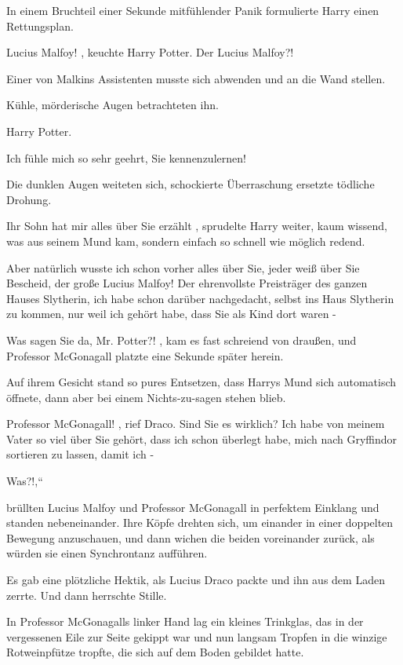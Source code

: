 In einem Bruchteil einer Sekunde mitfühlender Panik formulierte Harry einen Rettungsplan.

\glqq Lucius Malfoy!\grqq{} , keuchte Harry Potter. \glqq Der Lucius Malfoy?!\grqq{}

Einer von
Malkins Assistenten musste sich abwenden und an die Wand stellen.

Kühle, mörderische Augen betrachteten ihn.

\glqq Harry Potter.\grqq{}

\glqq Ich fühle mich so sehr geehrt, Sie kennenzulernen!\grqq{}

Die dunklen Augen weiteten sich, schockierte Überraschung ersetzte tödliche Drohung.

\glqq Ihr
Sohn hat mir alles über Sie erzählt\grqq{} , sprudelte Harry weiter, kaum wissend, was aus seinem Mund kam, sondern
einfach so schnell wie möglich redend.

\glqq Aber natürlich wusste ich schon vorher alles über Sie, jeder
weiß über Sie Bescheid, der große Lucius Malfoy! Der ehrenvollste Preisträger des ganzen Hauses Slytherin, ich habe
schon darüber nachgedacht, selbst ins Haus Slytherin zu kommen, nur weil ich gehört habe, dass Sie als Kind dort waren
-\grqq{}

\glqq Was sagen Sie da, Mr. Potter?!\grqq{} ,
kam es fast schreiend von draußen, und Professor
McGonagall platzte eine Sekunde später herein.

Auf ihrem Gesicht stand so pures Entsetzen, dass Harrys Mund
sich automatisch öffnete, dann aber bei einem Nichts-zu-sagen stehen blieb.

\glqq Professor
McGonagall!\grqq{} , rief Draco. \glqq Sind Sie es wirklich? Ich habe von meinem Vater so viel über Sie gehört, dass ich
schon überlegt habe, mich nach Gryffindor sortieren zu lassen, damit ich -\grqq{}

\glqq Was?!,“

brüllten Lucius Malfoy und Professor McGonagall in perfektem Einklang und standen nebeneinander. Ihre Köpfe
drehten sich, um einander in einer
doppelten Bewegung anzuschauen, und dann wichen die beiden voreinander zurück,
als würden sie einen Synchrontanz aufführen.

Es gab eine plötzliche Hektik, als Lucius Draco packte und ihn
aus dem Laden zerrte. Und dann herrschte Stille.

In Professor McGonagalls linker Hand lag ein kleines
Trinkglas, das in der vergessenen Eile zur Seite gekippt war und nun langsam Tropfen in die winzige Rotweinpfütze
tropfte, die sich auf dem Boden gebildet hatte.

